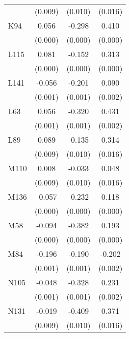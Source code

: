 \begin{table}[htbp]
\begin{tabular}{l*{3}{c}}
                &  (0.009)         &  (0.010)         &  (0.016)         \\
K94             &    0.056\sym{***}&   -0.298\sym{***}&    0.410\sym{***}\\
                &  (0.000)         &  (0.000)         &  (0.000)         \\
L115            &    0.081\sym{***}&   -0.152\sym{***}&    0.313\sym{***}\\
                &  (0.000)         &  (0.000)         &  (0.000)         \\
L141            &   -0.056\sym{***}&   -0.201\sym{***}&    0.090\sym{***}\\
                &  (0.001)         &  (0.001)         &  (0.002)         \\
L63             &    0.056\sym{***}&   -0.320\sym{***}&    0.431\sym{***}\\
                &  (0.001)         &  (0.001)         &  (0.002)         \\
L89             &    0.089\sym{***}&   -0.135\sym{***}&    0.314\sym{***}\\
                &  (0.009)         &  (0.010)         &  (0.016)         \\
M110            &    0.008         &   -0.033\sym{***}&    0.048\sym{***}\\
                &  (0.009)         &  (0.010)         &  (0.016)         \\
M136            &   -0.057\sym{***}&   -0.232\sym{***}&    0.118\sym{***}\\
                &  (0.000)         &  (0.000)         &  (0.000)         \\
M58             &   -0.094\sym{***}&   -0.382\sym{***}&    0.193\sym{***}\\
                &  (0.000)         &  (0.000)         &  (0.000)         \\
M84             &   -0.196\sym{***}&   -0.190\sym{***}&   -0.202\sym{***}\\
                &  (0.001)         &  (0.001)         &  (0.002)         \\
N105            &   -0.048\sym{***}&   -0.328\sym{***}&    0.231\sym{***}\\
                &  (0.001)         &  (0.001)         &  (0.002)         \\
N131            &   -0.019\sym{**} &   -0.409\sym{***}&    0.371\sym{***}\\
                &  (0.009)         &  (0.010)         &  (0.016)         \\

\end{tabular}
\end{table}

